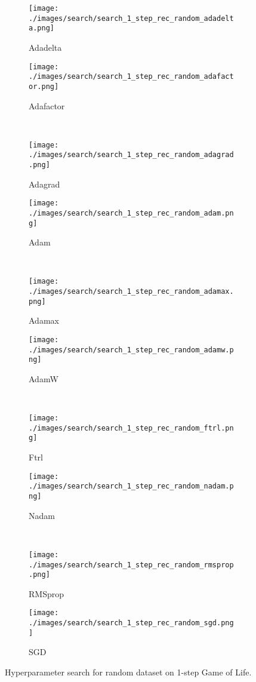 \documentclass[letterpaper]{article} %
\begin{document}
\clearpage
\begin{figure*}[ht!]
    \centering
    \begin{subfigure}{.49\linewidth}
        \texttt{[image: ./images/search/search\_1\_step\_rec\_random\_adadelta.png]}
        \caption{Adadelta}
    \end{subfigure}
    \begin{subfigure}{.49\linewidth}
        \texttt{[image: ./images/search/search\_1\_step\_rec\_random\_adafactor.png]}
        \caption{Adafactor}
    \end{subfigure}
    \\
    \begin{subfigure}{.49\linewidth}
        \texttt{[image: ./images/search/search\_1\_step\_rec\_random\_adagrad.png]}
        \caption{Adagrad}
    \end{subfigure}
    \begin{subfigure}{.49\linewidth}
        \texttt{[image: ./images/search/search\_1\_step\_rec\_random\_adam.png]}
        \caption{Adam}
    \end{subfigure}
    \\
    \begin{subfigure}{.49\linewidth}
        \texttt{[image: ./images/search/search\_1\_step\_rec\_random\_adamax.png]}
        \caption{Adamax}
    \end{subfigure}
    \begin{subfigure}{.49\linewidth}
        \texttt{[image: ./images/search/search\_1\_step\_rec\_random\_adamw.png]}
        \caption{AdamW}
    \end{subfigure}
    \\
    \begin{subfigure}{.49\linewidth}
        \texttt{[image: ./images/search/search\_1\_step\_rec\_random\_ftrl.png]}
        \caption{Ftrl}
    \end{subfigure}
    \begin{subfigure}{.49\linewidth}
        \texttt{[image: ./images/search/search\_1\_step\_rec\_random\_nadam.png]}
        \caption{Nadam}
    \end{subfigure}
    \\
    \begin{subfigure}{.49\linewidth}
        \texttt{[image: ./images/search/search\_1\_step\_rec\_random\_rmsprop.png]}
        \caption{RMSprop}
    \end{subfigure}
    \begin{subfigure}{.49\linewidth}
        \texttt{[image: ./images/search/search\_1\_step\_rec\_random\_sgd.png]}
        \caption{SGD}
    \end{subfigure}
    \caption{Hyperparameter search for random dataset on 1-step Game of Life.}
    \label{fig:search_1_random}
\end{figure*}
\end{document}
